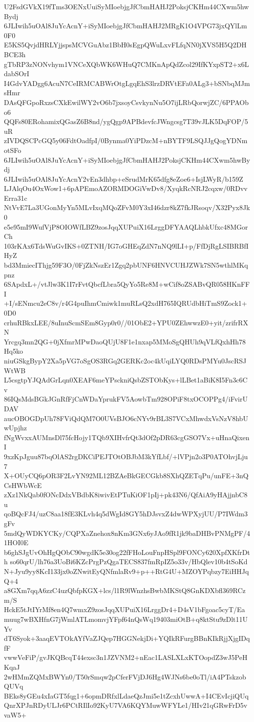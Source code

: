 U2FsdGVkX19fTms3OENxUuiSyMIoebjgJfCbmHAHJ2PoksjCKHm44CXwm5hwBydj
6JLIwih5uOAl8JuYcAcnY+iSyMIoebjgJfCbmHAHJ2MRgK1O4VPG73jxQYlLm0F0
E5KS5QvjdHRLYjjspsMCVGuAbz1BbH0sEgpQWuLxvFLfqNN0jXVS5H5Q2DHBCE3h
gTbRP3zNONvhym1VNCeXQbWK6WHuQ7CMKnApQdZcol29IfKYxpST2+x6LdabSOrI
I4GdvYADgg6AcuN7CeIRMCABWrOtgLgqEhS3lrzDRVtEFa0ALg3+bSNbqMJmsHmr
DAsQFGpoRxzsCXkEwilWY2vO6b7jxsoyCsvkynNu5O7ijLRbQorwjZC/6PPAObo6
QQFs80ERohamixQGasZ6B8nd/ygQgp9APBdevfcJWngcsg7T39vJLK5DqFOP/5uR
zIVDQSCPcGQ5y06FdtOadfpI/0Bynma0YiPDzcM+nBYTF9LSQJJgQogYDNmotSFo
6JLIwih5uOAl8JuYcAcnY+iSyMIoebjgJfCbmHAHJ2PoksjCKHm44CXwm5hwBydj
6JLIwih5uOAl8JuYcAcnY2vEn3dhbp+eSrudMrK65dfg8eZoe6+IsjLWyR/b159Z
LJAlqOu4OxWow1+6pAPEmoAZORMDOGiVwDv8/XyqkRcNRJ2cqxw/0RDvvErra31c
NtVvE7La3UGonMyYn5MLvIxqMQoZFvM0Y3xI46dzr8kZ7fkJRsoqv/X32Pyx8Jk0
e5e95mI9WufVjP8OIOWfLBZ9zosJqqXUPuiX16LrggDFYAAQLhbkUfxc48MGorCh
103rKAx6TdsWuGvIKS+0ZTNH/IG7oGHEqZdN7nNQ9lLI+p/FfDjRgLSIBRBfIHyZ
bd3MmiecIThjg59F3O/0FjZkNszEr1Zgq2pbUNF6HNVCUHJZWk7SN5wthlMKqpnz
6SApdxL+/vtJlw3K1I7rFvtQbcfLbra5QyYo5Re8M+wCif8oZSABvQR058HKnFFI
+I/sENmcu2eC8v/r4G4puIhmCmiwk1muRLsQ2xdH765IQRUdbHiTmS9Zock1+0D0
crhuRBkxLEE/8uInuScmSEm8Gyp0r0//01ObE2+YPU0ZEhwwzE0+yit/zrifrRXN
Yrcgq3mn2QG+0jXfmrMPwDaoQUjU8F1e1nxap5MMoSgQHUh9qVLfQxhHh78Hq5ko
niuGSkgBypY2Xa5pVG7oSgOS3RGq2GERKc2oc4kUqiLYQ0RDsPMYu0JscRSJWtWB
L5csgtpYJQAdGrLqn0XEAF6meYPsckniQsbZSTObKys+lLBet1aBiK8I5Fn3c6Cv
86IQsMdsBGkJGnRfFjCnWDaYprukFV5AowbTm928OPiF8txOCOPPg4/iFvirUDAV
aucOBOGDpUh78FViQdQM7O0UVsBJO6cNYv9rBL3S7VCxMhwdxVsNzV8hbUwUpjhz
fNgWvxxAUMnsDl75fcHojy1TQb9XIHvfrQt3dOf2pDR63cgGSO7Vx+uHnaQixenI
9xzKpJguu87bqOlAS2rgDKCiPEJTOtOBJbM3kYfLbf/+lVPjn2o3P0ATOhvjLju7
X+OUyCQ6pOR3F2LvYN92ML12BZAeBkGECGkb8SXhQZETqPu/unFE+3nQCsHWbWcE
zXz1NkQab0fONcDdxVBdbK8iwivEtPTuKiOF1pIj+pk43N6/QfAiA9yHAjjnbC8u
qoBQcFJ4/uzC8aa18fE3KLvh4q5dWgId8GY5hDJsvxZ4dwWPXyjUU/P7IWdm3gFv
5mdQyWDKYCKy/CQPXaZnehox8nKm3GNx6yJAo9fR1jk9baDHBvPNMgPF/41HOI0E
b6ghSJgUvOhHgQObC90wgdK5e30og22fFHoLouFnpHSpl9FONCy620XpfXKfrDth
so60qrU/lh76a3UoBi6KZcPrgPzQgaTECS837fmRpIZ5o33v/HbQlev10b4tSoKd
N+Jyu9yy8KcI133jx0oZNwitEyQNfmlaRv9+p++RtG4U+MZOYPqbzy7EiHHJqQ+4
a8GXm7qqA6zzC4uzQbfpKGX+lcs/l1R9lWnzhsBwbMKStQ8GnKDXbfl369RCzm/S
HckE5tJtIYrMf8en4Q7wmxZ9zosJqqXUPuiX16LrggDr4+D4sV1bFgoac5cyT/Ea
muug7wBXHfnG7jWmlATLmomvjYFpf64nQsWq19403miOtB+q8ktStu9zDlt11UYv
dT6Syok+3aaqEVTOkAYfVaZJQep7HGGNekjDi+YQIkRFurgBBnKIkRjjXjgIDqfF
vwwVeFiP/gvJKQBcqT44exsc3n1JZVNM2+nEac1LASLXLxKTOopdZ3wJ5PeHKqaJ
2wHMmZQMxBWYn0/T50rSmqw2pCferFVjDJ6Hg4WJNs6be0oTl/iA4PTskzobQUVq
BEks8yGEu4xIaGT5fqg1+6opmDRfxlLdaeQzJmi5e1tZcxhUwwA+I4CEvIcjiQUq
QnrXPJnRDyULJr6PCtRIlIo92KyU7VA6KQYMuwWFYLe1/HIv21qGRwFrD5vvaW5+
